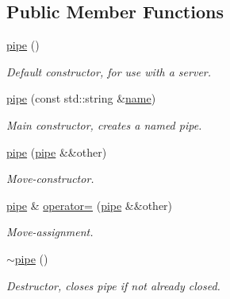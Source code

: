 \subsection*{Public Member Functions}
\begin{DoxyCompactItemize}
\item 
\mbox{\label{classcpen333_1_1process_1_1windows_1_1pipe_a1864834aacb230cb69f60d2a7456863b}} 
\hyperlink{classcpen333_1_1process_1_1windows_1_1pipe_a1864834aacb230cb69f60d2a7456863b}{pipe} ()
\begin{DoxyCompactList}\small\item\em Default constructor, for use with a server. \end{DoxyCompactList}\item 
\hyperlink{classcpen333_1_1process_1_1windows_1_1pipe_a2b63d6b649093ce1b883c3ae418db620}{pipe} (const std\+::string \&\hyperlink{classcpen333_1_1process_1_1impl_1_1named__resource__base_a53986a0a1dd26a3602b842c45613b79d}{name})
\begin{DoxyCompactList}\small\item\em Main constructor, creates a named pipe. \end{DoxyCompactList}\item 
\hyperlink{classcpen333_1_1process_1_1windows_1_1pipe_a4697295dcf61f8f1deb875adfb2ea303}{pipe} (\hyperlink{classcpen333_1_1process_1_1windows_1_1pipe}{pipe} \&\&other)
\begin{DoxyCompactList}\small\item\em Move-\/constructor. \end{DoxyCompactList}\item 
\hyperlink{classcpen333_1_1process_1_1windows_1_1pipe}{pipe} \& \hyperlink{classcpen333_1_1process_1_1windows_1_1pipe_a8e99292210a457c3c03f268fabd74e77}{operator=} (\hyperlink{classcpen333_1_1process_1_1windows_1_1pipe}{pipe} \&\&other)
\begin{DoxyCompactList}\small\item\em Move-\/assignment. \end{DoxyCompactList}\item 
\mbox{\label{classcpen333_1_1process_1_1windows_1_1pipe_a4f7a2b2d91861ff30b5979f61acec832}} 
\hyperlink{classcpen333_1_1process_1_1windows_1_1pipe_a4f7a2b2d91861ff30b5979f61acec832}{$\sim$pipe} ()
\begin{DoxyCompactList}\small\item\em Destructor, closes pipe if not already closed. \end{DoxyCompactList}\item 

\end{DoxyCompactItemize}
